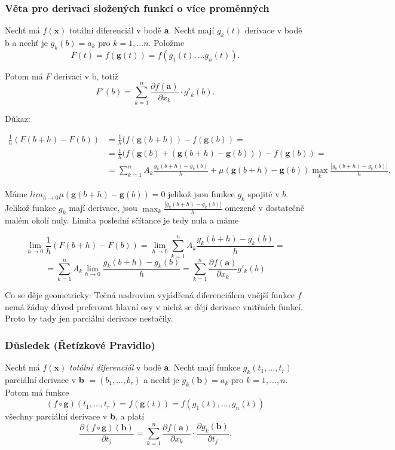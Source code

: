 \documentclass[../main.tex]{subfiles}
\begin{document}
\subsubsection{Věta pro derivaci složených funkcí o více proměnných}
\hspace{1.2mm}
Nechť má $f(\textbf{x})$ totální diferenciál v bodě \textbf{a}. Nechť mají $g_k(t)$ derivace v bodě b a nechť je $g_k(b) = a_k$ pro 
$k = 1,...n.$ Položme
\[F(t) = f(\textbf{g}(t)) = f(g_1(t),...g_n(t)).\]

Potom má $F$ derivaci v b, totiž 
\[F'(b) = \sum^n_{k=1}\frac{\partial f(\textbf{a})}{\partial x_k} \cdot g'_k(b).\]

Důkaz:

\begin{align*} 
 \frac{1}{h} (F(b+h) - F(b)) &= \frac{1}{h}(f(\textbf{g}(b+h)) - f(\textbf{g}(b)) =  \\
 &=\frac{1}{h}(f(\textbf{g}(b) + (\textbf{g}(b+h) - \textbf{g}(b))) - f(\textbf{g}(b)) = \\
 &=\sum^n_{k=1}A_k\frac{g_k(b+h)-g_k(b)}{h} + \mu(\textbf{g}(b+h) - \textbf{g}(b)) \max_k\frac{|g_k(b+h)-g_k(b)|}{h}.
\end{align*}

Máme $lim_{h \rightarrow 0} \mu(\textbf{g}(b+h)-\textbf{g}(b)) = 0$ jelikož jsou funkce $g_k$ spojité v $b$. 
Jelikož funkce $g_k$ mají derivace, jsou $\max_k \frac{|g_k(b+h) - g_k(b)|}{h}$ omezené v dostatečně malém okolí nuly. Limita 
poslední sčítance je tedy nula a máme

\[\lim_{h \rightarrow 0} \frac{1}{h}(F(b+h) - F(b)) = \lim_{h \rightarrow 0} \sum^n_{k = 1} A_k\frac{g_k(b+h)-g_k(b)}{h} = \]
\[= \sum^n_{k = 1}A_k\lim_{h \rightarrow 0} \frac{g_k(b+h) - g_k(b)}{h} = \sum^n_{k = 1}\frac{\partial f(\textbf{a})}{\partial x_k}g'_k(b)\]

\hspace{1.2mm}
Co se děje geometricky: Tečná nadrovina vyjádřená diferenciálem vnější funkce $f$ nemá žádny důvod preferovat hlavní osy v nichž se 
dějí derivace vnitřních funkcí. Proto by tady jen parciálni derivace nestačily. 
\noindent

\subsubsection{Důsledek (Řetízkové Pravidlo)}
\hspace{1.2mm}
Nechť má $f(\textbf{x})$ \textit{totální diferenciál} v bodě \textbf{a}. Nechť mají funkce $g_k(t_1,...,t_r)$ parciální 
derivace v \textbf{b} $= (b_1,...,b_r)$ a nechť je $g_k(\textbf{b}) = a_k$ pro $k = 1,...,n.$ Potom má funkce
\[(f\circ \textbf{g})(t_1,...,t_r) = f(\textbf{g}(t)) = f(g_1(t),...,g_n(t))\]
všechny parciální derivace v \textbf{b}, a platí 
\[\frac{\partial (f \circ \textbf{g})(\textbf{b})}{\partial t_j} = \sum^n_{k=1}\frac{\partial f(\textbf{a})}{\partial x_k}
\cdot \frac{\partial g_k(\textbf{b})}{\partial t_j}.\]
\end{document}
